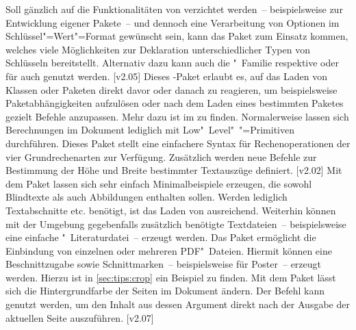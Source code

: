 \begin{DeclarePackages}
  Soll gänzlich auf die Funktionalitäten von  verzichtet 
  werden~-- beispielsweise zur Entwicklung eigener Pakete~-- und dennoch eine 
  Verarbeitung von Optionen im Schlüssel"=Wert"=Format gewünscht sein, kann das 
  Paket  zum Einsatz kommen, welches viele Möglichkeiten zur 
  Deklaration unterschiedlicher Typen von Schlüsseln bereitstellt. Alternativ 
  dazu kann auch die "~Familie respektive  oder 
  für  auch  genutzt werden.
[v2.05]
  Dieses \KOMAScript-Paket erlaubt es, auf das Laden von Klassen oder Paketen 
  direkt davor oder danach zu reagieren, um beispielsweise Paketabhängigkeiten 
  aufzulösen oder nach dem Laden eines bestimmten Paketes gezielt Befehle 
  anzupassen. Mehr dazu ist im \scrguide zu finden.
  Normalerweise lassen sich Berechnungen im Dokument lediglich mit 
  Low"~Level"~"=Primitiven durchführen. Dieses Paket stellt eine 
  einfachere Syntax für Rechenoperationen der vier Grundrechenarten zur 
  Verfügung. Zusätzlich werden neue Befehle zur Bestimmung der Höhe und Breite 
  bestimmter Textauszüge definiert.
[v2.02]
  Mit dem Paket  lassen sich sehr einfach Minimalbeispiele 
  erzeugen, die sowohl Blindtexte als auch Abbildungen enthalten sollen. Werden 
  lediglich Textabschnitte etc. benötigt, ist das Laden von  
  ausreichend. Weiterhin können mit der Umgebung  
  gegebenfalls zusätzlich benötigte Textdateien~-- beispielsweise eine einfache 
  "~Literaturdatei~-- erzeugt werden.
  Das Paket ermöglicht die Einbindung von einzelnen oder mehreren PDF"~Dateien.
  Hiermit können eine Beschnittzugabe sowie Schnittmarken~-- beispielsweise für 
  Poster~-- erzeugt werden. Hierzu ist in \autoref{sec:tips:crop} ein Beispiel 
  zu finden.
  Mit dem Paket lässt sich die Hintergrundfarbe der Seiten im Dokument ändern.
  Der Befehl  kann genutzt werden, um den 
  Inhalt aus dessen Argument direkt nach der Ausgabe der aktuellen Seite 
  auszuführen.
  [v2.07]

\end{DeclarePackages}
